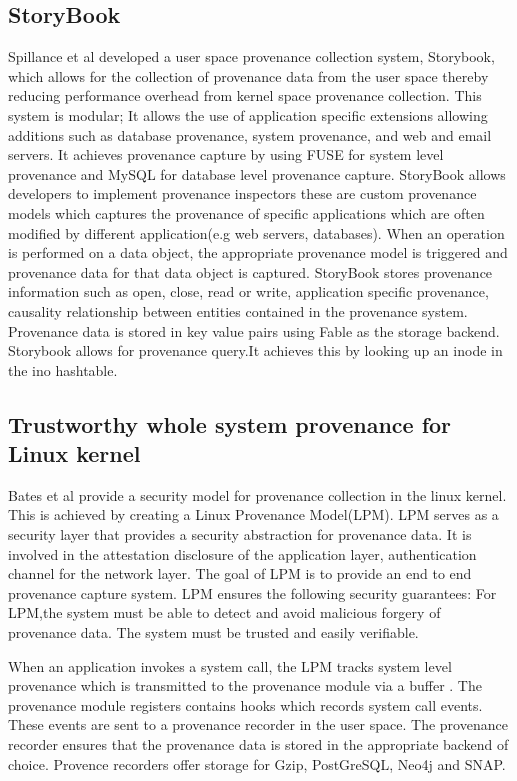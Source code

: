 \subsection{StoryBook}
Spillance et al \cite{story} developed a user space provenance collection system, Storybook, which allows for the collection of provenance data from the user space thereby reducing performance overhead from kernel space provenance collection. This system is modular; It allows the use of application specific extensions allowing additions such as database provenance, system provenance, and web and email servers. It achieves provenance capture by using FUSE for system level provenance and MySQL for database level provenance capture. StoryBook allows developers to implement provenance inspectors these are custom provenance models which captures the provenance of specific applications which are often modified by different application(e.g web servers, databases). When an operation is performed on a data object, the appropriate provenance model is triggered and provenance data for that data object is captured. StoryBook stores provenance information such as open, close, read or write, application specific provenance, causality relationship between entities contained in the provenance system. Provenance data is stored in key value pairs using Fable as the storage backend. Storybook allows for provenance query.It achieves this by looking up an inode in the ino hashtable.



\subsection{Trustworthy whole system provenance for Linux kernel}

Bates et al \cite{bates_towards_2013} provide a security model for provenance collection in the linux kernel. This is achieved by creating a Linux Provenance Model(LPM). LPM serves as a security layer that provides a security abstraction for provenance data. It is involved in the attestation disclosure of the application layer, authentication channel for the network layer. The goal of LPM is to provide an end to end provenance capture system. LPM ensures the following security guarantees: For LPM,the system must be able to detect and avoid malicious forgery of provenance data. The system must be trusted and easily verifiable. \par When an application invokes a system call, the LPM tracks system level provenance which is transmitted to the provenance module via a buffer . The provenance module registers contains hooks which records system call events. These events are sent to a provenance recorder in the user space. The provenance recorder ensures that the provenance data is stored in the appropriate backend of choice. Provence recorders offer storage for Gzip, PostGreSQL, Neo4j and SNAP.



